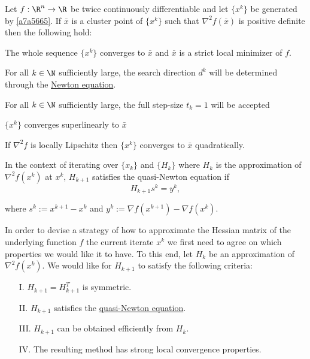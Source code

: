 Let $f:\R^n\to\R$ be twice continuously differentiable and let $\{x^k\}$ be
generated by \autoref{a7a5665}. If $\bar x$ is a cluster point of $\{x^k\}$
such that $\nabla^2f(\bar x)$ is positive definite then the following hold:
\begin{enumerata}
  \item The whole sequence $\{x^k\}$ converges to $\bar x$ and $\bar x$ is a
        strict local minimizer of $f$.
  \item For all $k\in\N$ sufficiently large, the search direction $d^k$ will be
        determined through the \href{d6c0554}{Newton equation}.
  \item For all $k\in\N$ sufficiently large, the full step-size $t_k=1$ will be
        accepted
  \item $\{x^k\}$ converges superlinearly to $\bar x$
  \item If $\nabla^2f$ is locally Lipschitz then $\{x^k\}$ converges to $\bar
        x$ quadratically.
\end{enumerata}

\label{cc538a4}

In the context of iterating over $\{x_k\}$ and $\{H_k\}$ where $H_k$ is the
approximation of $\nabla^2f(x^k)$ at $x^k$, $H_{k+1}$ satisfies the
quasi-Newton equation if
$$
  H_{k+1}s^k=y^k,
$$

where $s^k:=x^{k+1}-x^k$ and $y^k:=\nabla f(x^{k+1})-\nabla f(x^k)$.

\label{f25ca2a}

In order to devise a strategy of how to approximate the Hessian matrix of the
underlying function $f$ the current iterate $x^k$ we first need to agree on
which properties we would like it to have. To this end, let $H_k$ be an
approximation of $\nabla^2f(x^k)$. We would like for $H_{k+1}$ to satisfy the
following criteria:
\begin{enumerate}
  \item [I.] $H_{k+1}=H_{k+1}^T$ is symmetric.
  \item [II.] $H_{k+1}$ satisfies the \href{cc538a4}{quasi-Newton equation}.
  \item [III.] $H_{k+1}$ can be obtained efficiently from $H_k$.
  \item [IV.] The resulting method has strong local convergence properties.
\end{enumerate}

\Remark{}\label{b19fe28}

